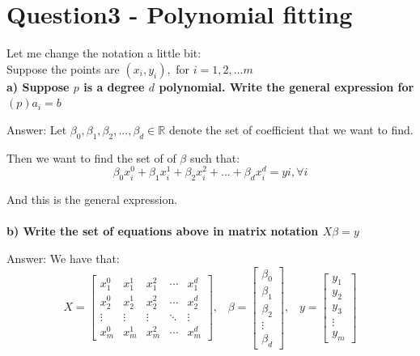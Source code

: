 \documentclass[paper=a4, fontsize=11pt]{scrartcl} %
\numberwithin{equation}{section} %
\numberwithin{figure}{section} %
\numberwithin{table}{section} %
\begin{document}
\newpage
\section*{Question3 - Polynomial fitting}

Let me change the notation a little bit: \\
Suppose the points are $(x_i, y_i),$ for $i = 1, 2, ... m$\\

\textbf{a) Suppose $p$ is a degree $d$ polynomial. Write the general expression for $(p)a_i = b$}  

Answer: Let $\beta_0,\beta_1,\beta_2,...,\beta_d \in \mathbb{R} $ denote the set of coefficient that we want to find. 

Then we want to find the set of of $\beta$ such that: 
$$
\beta_0 x_i^{0} + \beta_1 x_i^{1} + \beta_2 x_i^{2} +...+ \beta_d x_i^{d} = yi, \forall i 
$$

And this is the general expression. \\\\


\textbf{b) Write the set of equations above in matrix notation $X \beta = y$}  


Answer: 
We have that: 
$$
X = 
\begin{bmatrix}
x_1^{0} & x_1^{1} & x_1^{2} & \cdots & x_1^{d} \\
x_2^{0} & x_2^{1} & x_2^{2} & \cdots & x_2^{d} \\
\vdots  & \vdots  & \vdots  & \ddots & \vdots \\
x_m^{0} & x_m^{1} & x_m^{2} & \cdots & x_m^{d} 
\end{bmatrix}, 
\;\;\;
\beta = 
\begin{bmatrix}
\beta_0 \\ 
\beta_1 \\ 
\beta_2 \\ 
\vdots  \\
\beta_d 
\end{bmatrix},
\;\;\;
y = 
\begin{bmatrix}
y_1 \\
y_2 \\
y_3 \\
\vdots \\ 
y_m 
\end{bmatrix}
$$
\end{document}
